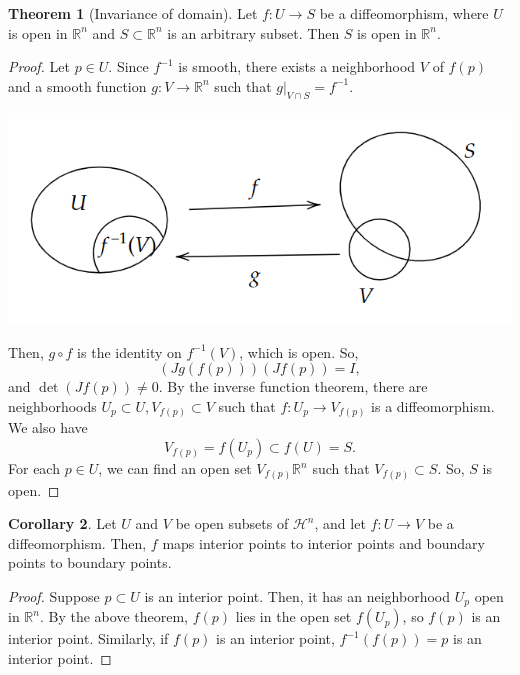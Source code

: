 \documentclass[]{article}
\DeclareMathOperator{\Det}{det}
\theoremstyle{definition}
\newtheorem{theorem}{Theorem}[section] %
\theoremstyle{definition}
\newtheorem{corollary}[theorem]{Corollary}
\begin{document}
\begin{theorem}[Invariance of domain]
    Let $f:U\rightarrow S$ be a diffeomorphism, where $U$ is open in $\mathbb{R}^n$ and $S\subset \mathbb{R}^n$ is an arbitrary subset. Then $S$ is open in $\mathbb{R}^n$.
\end{theorem}
\begin{proof}
    Let $p\in U$. Since $f^{-1}$ is smooth, there exists a neighborhood $V$ of $f(p)$ and a smooth function $g:V \rightarrow \mathbb{R}^n$ such that $g|_{V\cap S}=f^{-1}$.
\begin{center}
    
    \includegraphics[scale=0.5]{smooth_invariance.PNG}
\end{center}

    Then, $g\circ f$ is the identity on $f^{-1}(V)$, which is open. So, \[(Jg(f(p)))(Jf(p))=I,\] and $\Det(Jf(p))\neq 0$. By the inverse function theorem, there are neighborhoods $U_p\subset U, V_{f(p)}\subset V$ such that $f:U_p \rightarrow V_{f(p)}$ is a diffeomorphism. We also have \[V_{f(p)}=f(U_p)\subset f(U)=S.\] For each $p\in U$, we can find an open set $V_{f(p)}\mathbb{R}^n$ such that $V_{f(p)}\subset S$. So, $S$ is open.
\end{proof}

\begin{corollary}
    Let $U$ and $V$ be open subsets of $\mathcal{H}^n$, and let $f:U \rightarrow V$ be a diffeomorphism. Then, $f$ maps interior points to interior points and boundary points to boundary points.
\end{corollary}
\begin{proof} 
    Suppose $p\subset U$ is an interior point. Then, it has an neighborhood $U_p$ open in $\mathbb{R}^n$. By the above theorem, $f(p)$ lies in the open set $f(U_p)$, so $f(p)$ is an interior point. Similarly, if $f(p)$ is an interior point, $f^{-1}(f(p))=p$ is an interior point.
\end{proof}
\end{document}
